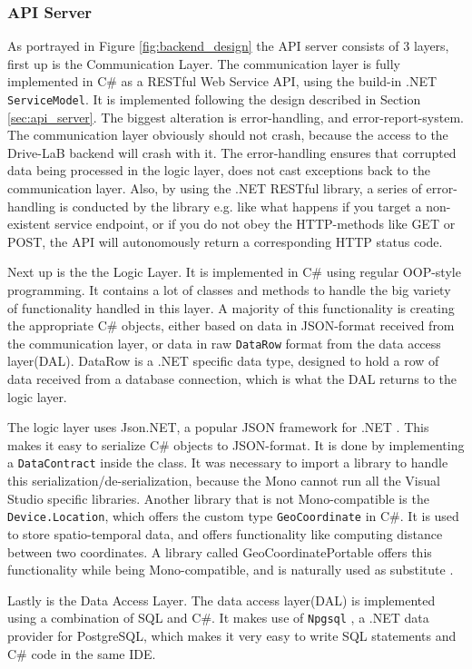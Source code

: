 \subsubsection{API Server}\label{subsec:impl_api_server}
As portrayed in Figure \ref{fig:backend_design} the API server consists of 3 layers, first up is the Communication Layer.
The communication layer is fully implemented in C\# as a RESTful Web Service API, using the build-in .NET \texttt{ServiceModel}. It is implemented following the design described in Section \ref{sec:api_server}. The biggest alteration is error-handling, and error-report-system. The communication layer obviously should not crash, because the access to the Drive-LaB backend will crash with it. The error-handling ensures that corrupted data being processed in the logic layer, does not cast exceptions back to the communication layer. Also, by using the .NET RESTful library, a series of error-handling is conducted by the library e.g. like what happens if you target a non-existent service endpoint, or if you do not obey the HTTP-methods like GET or POST, the API will autonomously return a corresponding HTTP status code.

Next up is the the Logic Layer. It is implemented in C\# using regular OOP-style programming. It contains a lot of classes and methods to handle the big variety of functionality handled in this layer. A majority of this functionality is creating the appropriate C\# objects, either based on data in JSON-format received from the communication layer, or data in raw \texttt{DataRow} format from the data access layer(DAL). DataRow is a .NET specific data type, designed to hold a row of data received from a database connection, which is what the DAL returns to the logic layer.  

The logic layer uses Json.NET, a popular JSON framework for .NET \citep{json_dot_net}. This makes it easy to serialize C\# objects to JSON-format. It is done by implementing a \texttt{DataContract} inside the class. It was necessary to import a library to handle this serialization/de-serialization, because the Mono cannot run all the Visual Studio specific libraries. Another library that is not Mono-compatible is the \texttt{Device.Location}, which offers the custom type \texttt{GeoCoordinate} in C\#. It is used to store spatio-temporal data, and offers functionality like computing distance between two coordinates. A library called GeoCoordinatePortable offers this functionality while being Mono-compatible, and is naturally used as substitute \citep{geocoordinateportable}.

Lastly is the Data Access Layer. The data access layer(DAL) is implemented using a combination of SQL and C\#. It makes use of \texttt{Npgsql} \citep{npgsql}, a .NET data provider for PostgreSQL, which makes it very easy to write SQL statements and C\# code in the same IDE. 